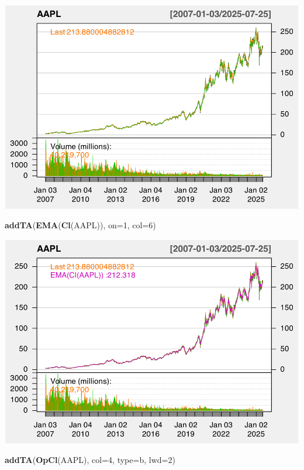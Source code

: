 \documentclass[]{ctexbook}
\newenvironment{Shaded}{\begin{snugshade}}{\end{snugshade}}
\newcommand{\AttributeTok}[1]{\textcolor[rgb]{0.13,0.29,0.53}{#1}}
\newcommand{\DecValTok}[1]{\textcolor[rgb]{0.00,0.00,0.81}{#1}}
\newcommand{\FunctionTok}[1]{\textcolor[rgb]{0.13,0.29,0.53}{\textbf{#1}}}
\newcommand{\NormalTok}[1]{#1}
\newcommand{\StringTok}[1]{\textcolor[rgb]{0.31,0.60,0.02}{#1}}
\begin{document}
\includegraphics[width=0.9\linewidth]{QuantmodHandbook_files/figure-latex/newta-1}

\begin{Shaded}
\begin{Highlighting}[]
\FunctionTok{addTA}\NormalTok{(}\FunctionTok{EMA}\NormalTok{(}\FunctionTok{Cl}\NormalTok{(AAPL)), }\AttributeTok{on=}\DecValTok{1}\NormalTok{, }\AttributeTok{col=}\DecValTok{6}\NormalTok{)}
\end{Highlighting}
\end{Shaded}

\includegraphics[width=0.9\linewidth]{QuantmodHandbook_files/figure-latex/newta-2}

\begin{Shaded}
\begin{Highlighting}[]
\FunctionTok{addTA}\NormalTok{(}\FunctionTok{OpCl}\NormalTok{(AAPL), }\AttributeTok{col=}\DecValTok{4}\NormalTok{, }\AttributeTok{type=}\StringTok{\textquotesingle{}b\textquotesingle{}}\NormalTok{, }\AttributeTok{lwd=}\DecValTok{2}\NormalTok{)}
\end{Highlighting}
\end{Shaded}
\end{document}
